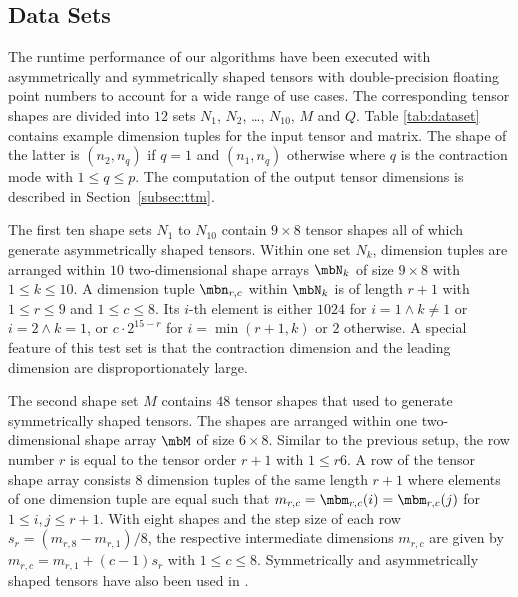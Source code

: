  
\subsection{Data Sets} 
The runtime performance of our algorithms have been executed with asymmetrically and symmetrically shaped tensors with double-precision floating point numbers to account for a wide range of use cases.
The corresponding tensor shapes are divided into $12$ sets $N_1$, $N_2$, \dots, $N_{10}$, $M$ and $Q$.
Table \ref{tab:dataset} contains example dimension tuples for the input tensor and matrix.
The shape of the latter is $(n_2,n_q)$ if $q=1$ and $(n_1,n_q)$ otherwise where $q$ is the contraction mode with $1 \leq q \leq p$.
The computation of the output tensor dimensions is described in Section~\ref{subsec:ttm}.

The first ten shape sets $N_1$ to $N_{10}$ contain $9 \times 8$ tensor shapes all of which generate asymmetrically shaped tensors.
Within one set $N_k$, dimension tuples are arranged within $10$ two-dimensional shape arrays $\mbN_k$ of size $9 \times 8$ with $1 \leq k \leq 10$.
A dimension tuple $\mbn_{r,c}$ within $\mbN_k$ is of length $r+1$ with $1 \leq r \leq 9$ and $1 \leq c \leq 8$.
Its $i$-th element is either $1024$ for $i = 1 \wedge k \neq 1$ or $i = 2 \wedge k = 1$, or $c \cdot 2^{15-r}$ for $i = \min(r+1,k)$ or $2$ otherwise.
A special feature of this test set is that the contraction dimension and the leading dimension are disproportionately large.

The second shape set $M$ contains $48$ tensor shapes that used to generate symmetrically shaped tensors.
The shapes are arranged within one two-dimensional shape array $\mbM$ of size $6 \times 8$.
Similar to the previous setup, the row number $r$ is equal to the tensor order $r+1$ with $1 \leq r 6$.
A row of the tensor shape array consists $8$ dimension tuples of the same length $r+1$ where elements of one dimension tuple are equal such that $m_{r,c} = \mbm_{r,c}(i) = \mbm_{r,c}(j)$ for $1 \leq i,j \leq r+1$.
With eight shapes and the step size of each row $s_r = (m_{r,8}-m_{r,1})/8$, the respective intermediate dimensions $m_{r,c}$ are given by $m_{r,c} = m_{r,1} + (c-1) s_r$ with $1 \leq c \leq 8$.
Symmetrically and asymmetrically shaped tensors have also been used in \cite{bassoy:2019:ttv, bassoy:2018:fast}.

